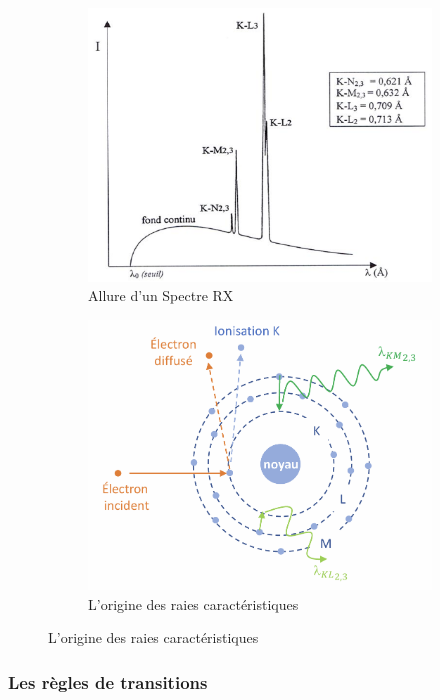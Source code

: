 \documentclass{article}
\begin{document}
\begin{figure}[ht]
    \centering
    \begin{subfigure}{0.48\textwidth}
        \centering
        \includegraphics[width=0.9\linewidth]{Fig/Spectre-RX.png}
        \caption{Allure d'un Spectre RX}
        \label{fig:Spectre RX}
    \end{subfigure}
    \hfill\begin{subfigure}{0.48\textwidth}
        \centering
        \includegraphics[width=0.9\linewidth]{Fig/origine-raies-rx.png}
        \caption{L'origine des raies caractéristiques}
        \label{fig:origine des raies caractéristiques}
    \end{subfigure}
\end{figure}


\subsubsection{Les règles de transitions}
\end{document}
